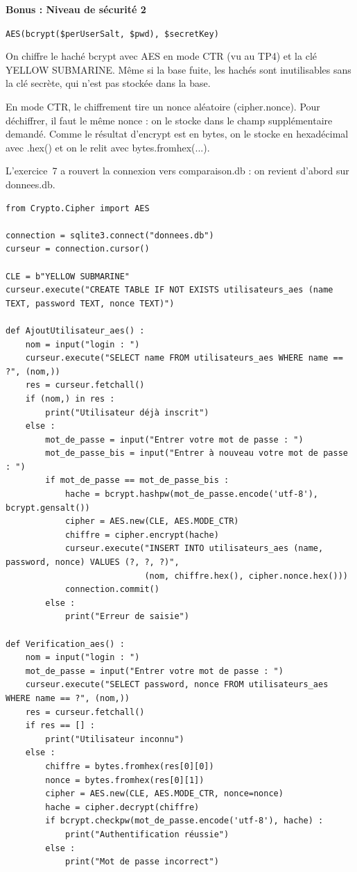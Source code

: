 \documentclass[11pt,a4paper]{article}
\newcommand{\code}[1]{\colorbox{fondcode}{\ttfamily\small #1}}
\begin{document}
\par\medskip\textbf{Bonus : Niveau de sécurité 2}

\begin{rappel}[Cours]
\texttt{AES(bcrypt(\$perUserSalt, \$pwd), \$secretKey)}
\end{rappel}

On chiffre le haché bcrypt avec AES en mode CTR (vu au TP4) et la clé \code{YELLOW SUBMARINE}. Même si la base fuite, les hachés sont inutilisables sans la clé secrète, qui n'est pas stockée dans la base.

En mode CTR, le chiffrement tire un \code{nonce} aléatoire (\code{cipher.nonce}). Pour déchiffrer, il faut le même nonce : on le stocke dans le champ supplémentaire demandé. Comme le résultat d'\code{encrypt} est en \code{bytes}, on le stocke en hexadécimal avec \code{.hex()} et on le relit avec \code{bytes.fromhex(...)}.

L'exercice~7 a rouvert la connexion vers \code{comparaison.db} : on revient d'abord sur \code{donnees.db}.

\begin{lstlisting}
from Crypto.Cipher import AES

connection = sqlite3.connect("donnees.db")
curseur = connection.cursor()

CLE = b"YELLOW SUBMARINE"
curseur.execute("CREATE TABLE IF NOT EXISTS utilisateurs_aes (name TEXT, password TEXT, nonce TEXT)")

def AjoutUtilisateur_aes() :
    nom = input("login : ")
    curseur.execute("SELECT name FROM utilisateurs_aes WHERE name == ?", (nom,))
    res = curseur.fetchall()
    if (nom,) in res :
        print("Utilisateur déjà inscrit")
    else :
        mot_de_passe = input("Entrer votre mot de passe : ")
        mot_de_passe_bis = input("Entrer à nouveau votre mot de passe : ")
        if mot_de_passe == mot_de_passe_bis :
            hache = bcrypt.hashpw(mot_de_passe.encode('utf-8'), bcrypt.gensalt())
            cipher = AES.new(CLE, AES.MODE_CTR)
            chiffre = cipher.encrypt(hache)
            curseur.execute("INSERT INTO utilisateurs_aes (name, password, nonce) VALUES (?, ?, ?)",
                            (nom, chiffre.hex(), cipher.nonce.hex()))
            connection.commit()
        else :
            print("Erreur de saisie")

def Verification_aes() :
    nom = input("login : ")
    mot_de_passe = input("Entrer votre mot de passe : ")
    curseur.execute("SELECT password, nonce FROM utilisateurs_aes WHERE name == ?", (nom,))
    res = curseur.fetchall()
    if res == [] :
        print("Utilisateur inconnu")
    else :
        chiffre = bytes.fromhex(res[0][0])
        nonce = bytes.fromhex(res[0][1])
        cipher = AES.new(CLE, AES.MODE_CTR, nonce=nonce)
        hache = cipher.decrypt(chiffre)
        if bcrypt.checkpw(mot_de_passe.encode('utf-8'), hache) :
            print("Authentification réussie")
        else :
            print("Mot de passe incorrect")
\end{lstlisting}
\end{document}

